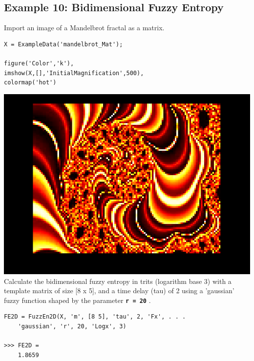 \documentclass[12pt, a4paper, titlepage, openany]{book}
\begin{document}
\subsection{\normalsize Example 10: \hspace{15mm} Bidimensional Fuzzy Entropy}
\noindent Import an image of a Mandelbrot fractal as a matrix.
\begin{verbatim}
X = ExampleData('mandelbrot_Mat');

figure('Color','k'), 
imshow(X,[],'InitialMagnification',500),
colormap('hot')
\end{verbatim}
\includegraphics[scale=.4]{mandelbrot.png}\newline \newline
Calculate the bidimensional fuzzy entropy in trits (logarithm base 3) with a template matrix of size [8 x 5], and a time delay (tau) of 2  using a 'gaussian' fuzzy function shaped by the parameter \texttt{\textbf{r = 20}} .
\begin{verbatim}
FE2D = FuzzEn2D(X, 'm', [8 5], 'tau', 2, 'Fx', . . .
	'gaussian', 'r', 20, 'Logx', 3)

>>> FE2D = 
	1.8659
\end{verbatim}






\end{document}
